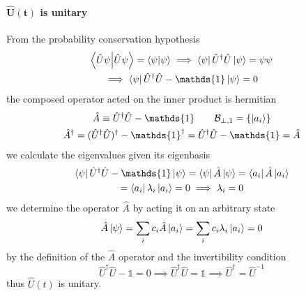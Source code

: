 \begin{multicols}{3}
  \paragraph{\textbf{$\boldsymbol{\hat{U}(t)}$ is unitary}} From the probability conservation hypothesis
  \begin{equation*}
    \begin{gathered}
      \braket{\hat{U}\psi} = \braket\psi \implies \bra\psi \hat{U}^\dagger \hat{U}\ket\psi = \psi\psi \\
      \implies
      \bra\psi \hat{U}^\dagger \hat{U} - \mathds{1}\ket\psi = 0
    \end{gathered}
  \end{equation*}
  the composed operator acted on the inner product is hermitian
  \begin{equation*}
    \begin{gathered}
      \hat{A} \equiv \hat{U}^\dagger \hat{U} - \mathds{1} \qquad \mathcal{B}_{\perp, 1} = \{\ket{a_i}\} \\
      \hat{A}^\dagger
      = (\hat{U}^\dagger \hat{U})^\dagger - \mathds{1}^\dagger
      = \hat{U}^\dagger \hat{U} - \mathds{1} = \hat{A}
    \end{gathered}
  \end{equation*}
  we calculate the eigenvalues given its eigenbasis
  \begin{equation*}
    \begin{gathered}
      \bra\psi \hat{U}^\dagger \hat{U} - \mathds{1}\ket\psi = \bra\psi \hat{A} \ket\psi = \bra{a_i} \hat{A} \ket{a_i} \\
      = \bra{a_i} \lambda_i \ket{a_i} = 0 \implies \lambda_i =  0
    \end{gathered}
  \end{equation*}
  we determine the operator $\hat{A}$ by acting it on an arbitrary state
  \begin{equation*}
    \begin{gathered}
      \hat{A}\ket\psi = \sum_i c_i\hat{A}\ket{a_i} = \sum_i c_i\lambda_i\ket{a_i} = 0
    \end{gathered}
  \end{equation*}
  by the definition of the $\hat{A}$ operator and the invertibility condition
  \begin{equation*}
    \hat{U}^\dagger \hat{U} - \mathds{1} = 0 \implies \hat{U}^\dagger \hat{U} = \mathds{1} \implies \hat{U}^\dagger = \hat{U}^{-1}
  \end{equation*}
  thus $\hat{U}(t)$ is unitary. \\


\end{multicols}
